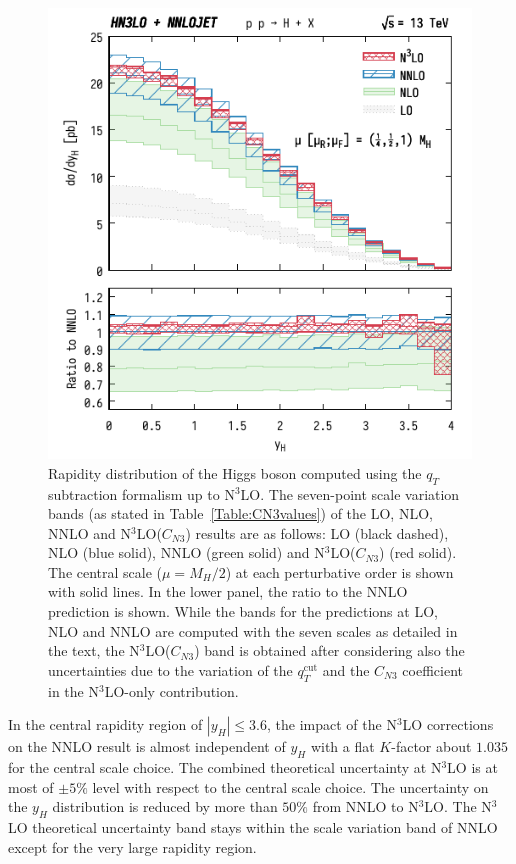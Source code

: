 \documentclass[12pt]{article}
\DeclareRobustCommand{\qt}{q_T}
\DeclareRobustCommand{\qtcut}{\ensuremath{q_T^\mathrm{cut}}}
\begin{document}
\begin{figure}[tbh]
\centering
\includegraphics[width=.6\linewidth]{./new_figures/yH_B02_best}
\caption{\label{fig:yHN3LO}{Rapidity distribution of the Higgs boson computed using the $\qt$ subtraction formalism up to N$^{3}$LO. The seven-point scale variation bands (as stated in Table~\ref{Table:CN3values}) of the LO, NLO, NNLO and N$^{3}$LO($C_{N3}$) results are as follows: LO (black dashed), NLO (blue solid), NNLO (green solid) and N$^{3}$LO($C_{N3}$) (red solid). The central scale ($\mu=M_{H}/2$) at each perturbative order is shown with solid lines. In the lower panel, the ratio to the NNLO prediction is shown. While the bands for the predictions at LO, NLO and NNLO are computed with the seven scales as detailed in the text, the N$^{3}$LO($C_{N3}$) band is obtained after considering also the uncertainties due to the variation of the $\qtcut$ and the $C_{N3}$ coefficient in the 
N$^{3}$LO-only contribution.
}}
\end{figure}
In the central rapidity region of $|y_{H}| \leq 3.6$, the impact of the N$^{3}$LO corrections on the NNLO result is almost independent of $y_{H}$ with a flat $K$-factor about $1.035$ for the central scale choice. The combined theoretical uncertainty at N$^3$LO is at most of $\pm 5 \%$ level with respect to the central scale choice. The uncertainty on the $y_H$ distribution is reduced by more than  $50\%$ from NNLO to N$^3$LO. The N$^3$LO theoretical uncertainty band stays within the scale variation band of NNLO except for the very large rapidity region.
\end{document}

